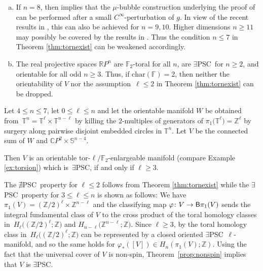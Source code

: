 \documentclass[10pt,a4paper]{amsart}
\numberwithin{equation}{section}
\newcommand{\F}{\mathbb{F}}
\newcommand{\Z}{\mathbb{Z}}
\newcommand{\R}{\mathbb{R}}
\newcommand{\SSS}{\mathbb{S}}
\newcommand{\TTT}{\mathbb{T}}
\newcommand{\charac}{\mathrm{char}}
\newcommand{\sB}{{\sf B}}
\newcommand{\no}{{\color{brown!70!black}$\nexists$}{\sf PSC}}
\newcommand{\yes}{{\color {blue!70!black}$\exists$}{\sf PSC}}
\begin{document}
\begin{Remark} \label{rem:higherdim_mantra}\qquad
 \begin{enumerate}[(a)]\itemsep=0pt
\item \label{mantra1} If $n = 8$, then \cite{Smale} implies that the $\mu$-bubble construction underlying the proof of \cite[Theorem 2.8]{Raede22} can be performed after a small $C^{\infty}$-perturbation of $g$.
In view of the recent results in \cite{CMS}, this can also be achieved for $n = 9, 10$.
Higher dimensions $n \geq 11$ may possibly be covered by the results in \cite{Loh2018}.
Thus the condition $n \leq 7$ in Theorem \ref{thm:tornexist} can be weakened accordingly.
\item The real projective spaces $\R P^n$ are $\F_2$-toral for all $n$, are \yes~for $n \geq 2$, and orientable for all odd $n \geq 3$.
Thus, if $\charac(\F) = 2$, then neither the orientability of $V$ nor the assumption~${\ell \leq 2}$ in Theorem \ref{thm:tornexist} can be dropped.
\end{enumerate}
\end{Remark}

\begin{Example} \label{ex:counterexample} Let $4 \leq n \leq 7$, let $0 \leq \ell \leq n $ and let the orientable manifold $W$ be obtained from~${{\TTT}^n = {\TTT}^{\ell} \times {\TTT}^{n-\ell}}$ by killing the $2$-multiples of generators of $\pi_1\big({\TTT}^\ell\big) = \Z^\ell$ by surgery along pairwise disjoint embedded circles in ${\TTT}^n$.
Let $V$ be the connected sum of $W$ and $\mathbb{C} P^{2} \times \SSS^{n-4}$.

Then $V$ is an orientable tor-$\ell / \F_{\!2}$-enlargeable manifold (compare Example \ref{ex:torsion}) which is~\yes, if and only if $\ell \geq 3$.

The \no~property for $\ell \leq 2$ follows from Theorem \ref{thm:tornexist} while the \yes~property for $3 \leq \ell \leq n$ is shown as follows:
We have $\pi_1(V) = (\Z/2)^{\ell} \times \Z^{n-\ell}$ and the classifying map $\varphi \colon V \to \sB \pi_1(V)$ sends the integral fundamental class of $V$ to the cross product of the toral homology classes in~${H_{\ell}\big((\Z/2)^{\ell} ; \Z\big)}$ and $H_{n-\ell}\big(\Z^{n-\ell}; \Z\big)$.
Since $\ell \geq 3$, by \cite[Theorem A]{Jo2004} the toral homology class in~${H_{\ell}\big((\Z/2)^{\ell} ; \Z\big)}$ can be represented by a closed oriented \yes~$\ell$-manifold, and so the same holds for $\varphi_*([V]) \in H_n(\pi_1(V) ; \Z)$.
Using the fact that the universal cover of $V$ is non-spin, Theorem~\ref{prop:nonspin} implies that $V$ is \yes.
\end{Example}
\end{document}
